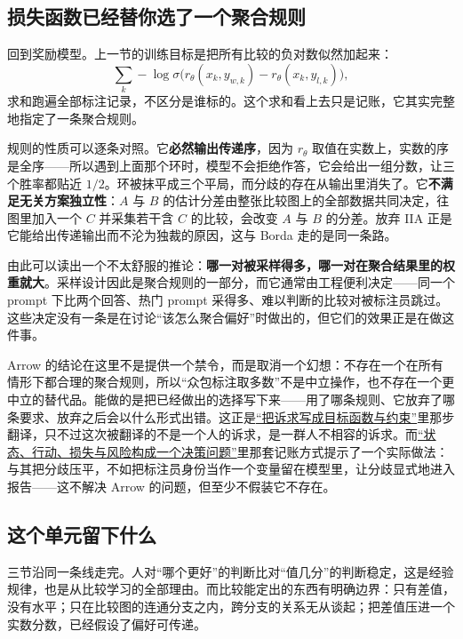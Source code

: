 \subsection{损失函数已经替你选了一个聚合规则}

回到奖励模型。上一节的训练目标是把所有比较的负对数似然加起来：
\[
\sum_{k}-\log\sigma\bigl(r_\theta(x_k,y_{w,k})-r_\theta(x_k,y_{l,k})\bigr),
\]
求和跑遍全部标注记录，不区分是谁标的。这个求和看上去只是记账，它其实完整地指定了一条聚合规则。

规则的性质可以逐条对照。它\textbf{必然输出传递序}，因为 \(r_\theta\) 取值在实数上，实数的序是全序——所以遇到上面那个环时，模型不会拒绝作答，它会给出一组分数，让三个胜率都贴近 \(1/2\)。环被抹平成三个平局，而分歧的存在从输出里消失了。它\textbf{不满足无关方案独立性}：\(A\) 与 \(B\) 的估计分差由整张比较图上的全部数据共同决定，往图里加入一个 \(C\) 并采集若干含 \(C\) 的比较，会改变 \(A\) 与 \(B\) 的分差。放弃 IIA 正是它能给出传递输出而不沦为独裁的原因，这与 Borda 走的是同一条路。

由此可以读出一个不太舒服的推论：\textbf{哪一对被采样得多，哪一对在聚合结果里的权重就大}。采样设计因此是聚合规则的一部分，而它通常由工程便利决定——同一个 prompt 下比两个回答、热门 prompt 采得多、难以判断的比较对被标注员跳过。这些决定没有一条是在讨论``该怎么聚合偏好''时做出的，但它们的效果正是在做这件事。

Arrow 的结论在这里不是提供一个禁令，而是取消一个幻想：不存在一个在所有情形下都合理的聚合规则，所以``众包标注取多数''不是中立操作，也不存在一个更中立的替代品。能做的是把已经做出的选择写下来——用了哪条规则、它放弃了哪条要求、放弃之后会以什么形式出错。这正是\hyperref[sec:18-Synthesis/01-System-Lifecycle/01]{``把诉求写成目标函数与约束''}里那步翻译，只不过这次被翻译的不是一个人的诉求，是一群人不相容的诉求。而\hyperref[sec:11-Mathematical-Statistics/07-Statistical-Decision-and-Reliable-Prediction/01]{``状态、行动、损失与风险构成一个决策问题''}里那套记账方式提示了一个实际做法：与其把分歧压平，不如把标注员身份当作一个变量留在模型里，让分歧显式地进入报告——这不解决 Arrow 的问题，但至少不假装它不存在。

\subsection{这个单元留下什么}

三节沿同一条线走完。人对``哪个更好''的判断比对``值几分''的判断稳定，这是经验规律，也是从比较学习的全部理由。而比较能定出的东西有明确边界：只有差值，没有水平；只在比较图的连通分支之内，跨分支的关系无从谈起；把差值压进一个实数分数，已经假设了偏好可传递。

